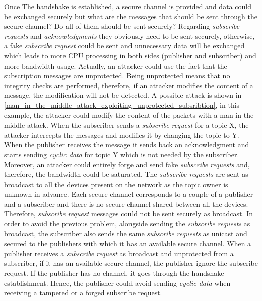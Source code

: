 Once The handshake is established, a secure channel is provided and data could be exchanged securely but what are the
messages that should be sent through the secure channel? Do all of them should be sent securely?
Regarding \textit{subscribe requests} and \textit{acknowledgments} they obviously need to be sent securely, otherwise, a fake
\textit{subscribe request} could be sent and unnecessary data will be exchanged which leads to more CPU processing in both sides
(publisher and subscriber) and more bandwidth usage.
Actually, an attacker could use the fact that the subscription messages are unprotected. Being unprotected means that no integrity checks are
performed, therefore, if an attacker modifies the content of a message, the modification will not be detected.
A possible attack is shown in \autoref{man_in_the_middle_attack_exploiting_unprotected_subsribtion}, in this example, the attacker could modify the content of the packets with
a man in the middle attack. When the subscriber sends a \textit{subscribe request} for a topic X, the attacker
intercepts the messages and modifies it by changing the topic to Y. When the publisher receives the message it
sends back an acknowledgment and starts sending \textit{cyclic data} for topic Y which is not needed by the subscriber.
Moreover, an attacker could entirely forge and send fake \textit{subscribe requests} and, therefore, the bandwidth could be saturated.
The \textit{subscribe requests} are sent as broadcast to all the devices present on the network as the topic owner is
unknown in advance. Each secure channel corresponds to a couple of a publisher and a subscriber and there is no
secure channel shared between all the devices. Therefore, \textit{subscribe request} messages could not be sent securely as broadcast.
In order to avoid the previous problem, alongside sending the \textit{subscribe requests} as broadcast, the subscriber also
sends the same \textit{subscribe requests} as unicast and secured to the publishers with which it has an available secure channel.
When a publisher receives a \textit{subscribe request} as broadcast and unprotected from a subscriber, if it has an available
secure channel, the publisher ignore the subscribe request. If the publisher has no channel, it goes through the handshake establishment.
Hence, the publisher could avoid sending \textit{cyclic data} when receiving a tampered or a forged subscribe request.

